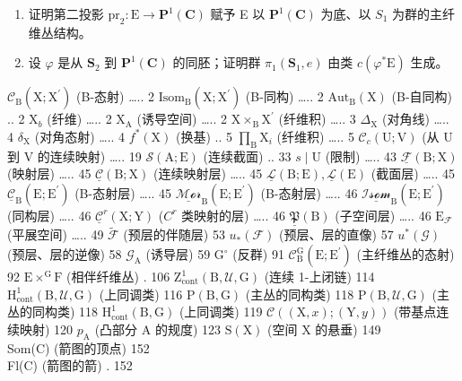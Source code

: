 \begin{enumerate}
\def\labelenumi{\alph{enumi})}
\item
  证明第二投影 \(\mathrm{pr}_{2}\colon\mathrm{E}\to\mathbf{P}^{1}(\mathbf{C})\) 赋予 E 以 \(\mathbf{P}^{1}(\mathbf{C})\) 为底、以 \(S_{1}\) 为群的主纤维丛结构。
\item
  设 \(\varphi\) 是从 \(\mathbf{S}_2\) 到 \(\mathbf{P}^1 (\mathbf{C})\) 的同胚；证明群 \(\pi_1(\mathbf{S}_1,e)\) 由类 \(c(\varphi^{*}\mathrm{E})\) 生成。
\end{enumerate}

\backmatter


 \(\mathcal{C}_{\mathrm{B}}(\mathrm{X};\mathrm{X}^{\prime})\) (B-态射) \ldots.. 2 \(\mathrm{Isom}_{\mathrm{B}}(\mathrm{X};\mathrm{X}^{\prime})\) (B-同构) \ldots.. 2 \(\mathrm{Aut}_{\mathrm{B}}(\mathrm{X})\) (B-自同构) .. 2 \(\mathrm{X}_{b}\) (纤维) \ldots.. 2 \(\mathrm{X}_{\mathrm{A}}\) (诱导空间) \ldots.. 2 \(\mathrm{X} \times_{\mathrm{B}} \mathrm{X}^{\prime}\) (纤维积) \ldots.. 3 \(\Delta_{\mathrm{X}}\) (对角线) \ldots.. 4 \(\delta_{\mathrm{X}}\) (对角态射) \ldots.. 4 \(f^{*}(\mathrm{X})\) (换基) .. 5 \(\prod_{\mathrm{B}} \mathrm{X}_{i}\) (纤维积) \ldots.. 5 \(\mathcal{C}_{c}(\mathrm{U};\mathrm{V})\) (从 U 到 V 的连续映射) \ldots.. 19 \(\mathcal{S}(\mathrm{A};\mathrm{E})\) (连续截面) .. 33 \(s \mid \mathrm{U}\) (限制) \ldots.. 43 \(\underline{\mathcal{F}}(\mathrm{B};\mathrm{X})\) (映射层) \ldots.. 45 \(\underline{\mathcal{C}}(\mathrm{B};\mathrm{X})\) (连续映射层) \ldots.. 45 \(\underline{\mathcal{L}}(\mathrm{B};\mathrm{E}), \underline{\mathcal{L}}(\mathrm{E})\) (截面层) \ldots.. 45 \(\underline{\mathcal{C}}_{\mathrm{B}}(\mathrm{E};\mathrm{E}^{\prime})\) (B-态射层) \ldots.. 45 \(\underline{\mathcal{Mor}}_{\mathrm{B}}(\mathrm{E};\mathrm{E}^{\prime})\) (B-态射层) \ldots.. 46 \(\underline{\mathcal{Isom}}_{\mathrm{B}}(\mathrm{E};\mathrm{E}^{\prime})\) (同构层) \ldots.. 46 \(\underline{\mathcal{C}}^{r}(\mathrm{X};\mathrm{Y})\) (\(C^{r}\) 类映射的层) \ldots.. 46 \(\underline{\mathfrak{P}}(\mathrm{B})\) (子空间层) \ldots.. 46 \(\mathrm{E}_{\mathcal{F}}\) (平展空间) \ldots.. 49 \(\widetilde{\mathcal{F}}\) (预层的伴随层) 53 \(u_{*}(\mathcal{F})\) (预层、层的直像) 57 \(u^{*}(\mathcal{G})\) (预层、层的逆像) 58 \(\mathcal{G}_{\mathrm{A}}\) (诱导层) 59 \(\mathrm{G}^{\circ}\) (反群) 91 \(\mathcal{C}_{\mathrm{B}}^{\mathrm{G}}(\mathrm{E};\mathrm{E}^{\prime})\) (主纤维丛的态射) 92 \(\mathrm{E} \times^{\mathrm{G}} \mathrm{F}\) (相伴纤维丛) . 106 \(\mathrm{Z}_{\mathrm{cont}}^{1}(\mathrm{B},\mathcal{U},\mathrm{G})\) (连续 1-上闭链) 114 \(\mathrm{H}_{\mathrm{cont}}^{1}(\mathrm{B},\mathcal{U},\mathrm{G})\) (上同调类) 116 \(\mathrm{P}(\mathrm{B},\mathrm{G})\) (主丛的同构类) 118 \(\mathrm{P}(\mathrm{B},\mathcal{U},\mathrm{G})\) (主丛的同构类) 118 \(\mathrm{H}_{\mathrm{cont}}^{1}(\mathrm{B},\mathrm{G})\) (上同调类) 119 \(\mathcal{C}((\mathrm{X},x);(\mathrm{Y},y))\) (带基点连续映射) 120 \(p_{\mathrm{A}}\) (凸部分 A 的规度) 123 \(\mathrm{S}(\mathrm{X})\) (空间 X 的悬垂) 149\\
Som(C) (箭图的顶点) 152\\
Fl(C) (箭图的箭) . 152

